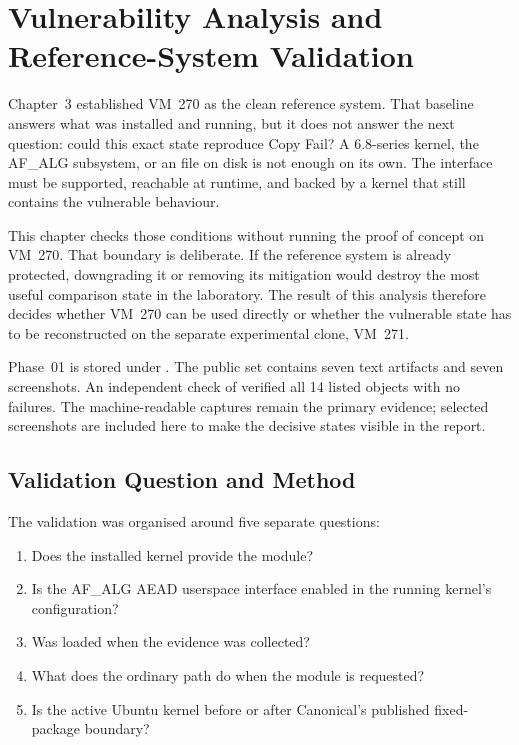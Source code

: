 \section{Vulnerability Analysis and Reference-System Validation}
\label{sec:reference-validation}

\graphicspath{{../evidence/}{evidence/}}

Chapter~3 established VM~270  as the clean reference system.
That baseline answers what was installed and running, but it does not answer the
next question: could this exact state reproduce Copy Fail? A 6.8-series kernel,
the AF\_ALG subsystem, or an  file on disk is not enough on
its own. The interface must be supported, reachable at runtime, and backed by a
kernel that still contains the vulnerable behaviour.

This chapter checks those conditions without running the proof of concept on
VM~270. That boundary is deliberate. If the reference system is already
protected, downgrading it or removing its mitigation would destroy the most
useful comparison state in the laboratory. The result of this analysis therefore
decides whether VM~270 can be used directly or whether the vulnerable state has
to be reconstructed on the separate experimental clone, VM~271.

\begin{evidencebox}
Phase~01 is stored under
. The public set contains seven
text artifacts and seven screenshots. An independent check of
 verified all 14 listed objects with no failures. The
machine-readable captures remain the primary evidence; selected screenshots are
included here to make the decisive states visible in the report.
\end{evidencebox}

\subsection{Validation Question and Method}

The validation was organised around five separate questions:

\begin{enumerate}
    \item Does the installed kernel provide the  module?
    \item Is the AF\_ALG AEAD userspace interface enabled in the running
          kernel's configuration?
    \item Was  loaded when the evidence was collected?
    \item What does the ordinary  path do when the module is
          requested?
    \item Is the active Ubuntu kernel before or after Canonical's published
          fixed-package boundary?
\end{enumerate}

